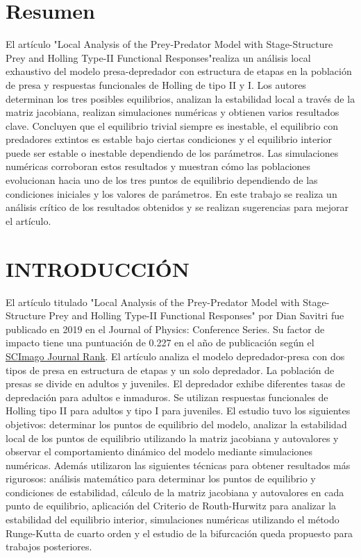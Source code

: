 \documentclass{wscpaperproc}
\theoremstyle{wsc}
\begin{document}
\section*{Resumen}
El artículo "Local Analysis of the Prey-Predator Model with Stage-Structure Prey and Holling
Type-II Functional Responses"\hspace{0.1cm}realiza un análisis local exhaustivo del modelo presa-depredador con estructura de
etapas en la población de presa y respuestas funcionales de Holling de tipo II y I. Los autores determinan los tres 
posibles equilibrios, analizan la estabilidad local a través de la matriz jacobiana, realizan simulaciones numéricas y 
obtienen varios resultados clave. Concluyen que el equilibrio trivial siempre es inestable, el equilibrio con predadores 
extintos es estable bajo ciertas condiciones y el equilibrio interior puede ser estable o inestable dependiendo de los parámetros. 
Las simulaciones numéricas corroboran estos resultados
y muestran cómo las poblaciones evolucionan hacia uno de los tres puntos de equilibrio dependiendo de las
condiciones iniciales y los valores de parámetros. En este trabajo se realiza un análisis crítico de 
los resultados obtenidos y se realizan sugerencias para mejorar el artículo.


\section{INTRODUCCI\'ON}
\label{sec:intro}
El artículo titulado "Local Analysis of the Prey-Predator Model with Stage-Structure Prey and Holling
Type-II Functional Responses" por Dian Savitri fue publicado en 2019
en el Journal of Physics: Conference Series. Su factor de impacto tiene una puntuaci\'on de 0.227 en el año de
publicación según el \href{https://www.scimagojr.com/}{SCImago Journal Rank}. El artículo analiza el modelo depredador-presa con dos tipos de presa en estructura
de etapas y un solo depredador. La población de presas se divide en adultos y juveniles. El depredador
exhibe diferentes tasas de depredación para adultos e inmaduros. Se utilizan respuestas funcionales de
Holling \cite{holling_functional_1965} tipo II  para adultos y tipo I para juveniles. El estudio tuvo los siguientes objetivos:
determinar los puntos de equilibrio del modelo, analizar la estabilidad local de los puntos de equilibrio
utilizando la matriz jacobiana y autovalores y observar el comportamiento dinámico del modelo mediante
simulaciones numéricas. Además utilizaron las siguientes técnicas para obtener resultados
más rigurosos: análisis matemático para determinar los puntos de equilibrio y condiciones de estabilidad,
cálculo de la matriz jacobiana y autovalores en cada punto de equilibrio, aplicación del Criterio de Routh-Hurwitz
para analizar la estabilidad del equilibrio interior, simulaciones numéricas utilizando el método Runge-Kutta de
cuarto orden y el estudio de la bifurcación queda propuesto para trabajos posteriores. 
\end{document}
